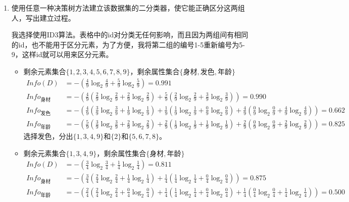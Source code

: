 \documentclass[10pt, UTF8]{article}
\begin{document}
\begin{enumerate}
  \item 使用任意一种决策树方法建立该数据集的二分类器，使它能正确区分这两组人，写出建立过程。
  
  我选择使用ID3算法。表格中的id对分类无任何影响，而且因为两组间有相同的id，也不能用于区分元素，为了方便，我将第二组的编号1-5重新编号为5-9，这样id就可以用来区分元素。
  
  \begin{itemize}
    \item 剩余元素集合$\{1, 2, 3, 4, 5, 6, 7, 8, 9\}$，剩余属性集合$\{\text{身材}, \text{发色}, \text{年龄}\}$
    \begin{align*}
    Info(D) &= -(\frac{4}{9}\log_2{\frac{4}{9}} + \frac{5}{9}\log_2{\frac{5}{9}}) = 0.991 \\
    Info_{\text{身材}} &= -(\frac{4}{9}(\frac{2}{9}\log_2{\frac{2}{9}} + \frac{2}{9}\log_2{\frac{2}{9}}) + \frac{5}{9}(\frac{2}{9}\log_2{\frac{2}{9}} + \frac{3}{9}\log_2{\frac{3}{9}})) = 0.990  \\
    Info_{\text{发色}} &= -(\frac{4}{9}(\frac{3}{9}\log_2{\frac{3}{9}} + \frac{1}{9}\log_2{\frac{1}{9}}) + \frac{1}{9}(\frac{1}{9}\log_2{\frac{1}{9}} + \frac{0}{9}\log_2{\frac{0}{9}}) + \frac{4}{9}(\frac{0}{9}\log_2{\frac{0}{9}} + \frac{4}{9}\log_2{\frac{4}{9}})) = 0.662  \\
    Info_{\text{年龄}} &= -(\frac{5}{9}(\frac{3}{9}\log_2{\frac{3}{9}} + \frac{2}{9}\log_2{\frac{2}{9}}) + \frac{2}{9}(\frac{1}{9}\log_2{\frac{1}{9}} + \frac{1}{9}\log_2{\frac{1}{9}}) + \frac{2}{9}(\frac{0}{9}\log_2{\frac{0}{9}} + \frac{2}{9}\log_2{\frac{2}{9}})) = 0.825
    \end{align*}
    选择发色，分出$\{1, 3, 4, 9\}$和$\{2\}$和$\{5, 6, 7, 8\}$。
    \item 剩余元素集合$\{1, 3, 4, 9\}$，剩余属性集合$\{\text{身材}, \text{年龄}\}$
    \begin{align*}
    Info(D) &= -(\frac{3}{4}\log_2{\frac{3}{4}} + \frac{1}{4}\log_2{\frac{1}{4}}) = 0.811 \\
    Info_{\text{身材}} &= -(\frac{3}{4}(\frac{2}{4}\log_2{\frac{2}{4}} + \frac{1}{4}\log_2{\frac{1}{4}}) + \frac{1}{4}(\frac{1}{4}\log_2{\frac{1}{4}} + \frac{0}{4}\log_2{\frac{0}{4}})) = 0.875  \\
    Info_{\text{年龄}} &= -(\frac{2}{4}(\frac{2}{4}\log_2{\frac{2}{4}} + \frac{0}{4}\log_2{\frac{0}{4}}) + \frac{1}{4}(\frac{1}{4}\log_2{\frac{1}{4}} + \frac{0}{4}\log_2{\frac{0}{4}}) + \frac{1}{4}(\frac{0}{4}\log_2{\frac{0}{4}} + \frac{1}{4}\log_2{\frac{1}{4}})) = 0.500

\end{align*}
\end{itemize}
\end{enumerate}
\end{document}
